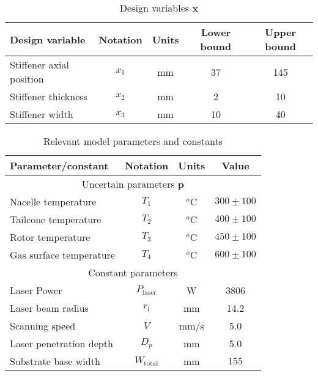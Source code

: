 \begin{table}[h!]
    \centering
    \renewcommand{\arraystretch}{1.0}%
    \small\addtolength{\tabcolsep}{-2pt}
    \caption{Design variables ${\textbf{x}}$}
    \label{table:STOmodelinputs}
    \begin{tabular}{lcccc}
    \hline\hline
    \bf Design variable & \bf Notation & \bf Units & \bf Lower bound & \bf Upper bound \\
    \hline
    Stiffener axial position & $x_1$ & mm & 37 & 145 \\
    Stiffener thickness  & $x_2$ & mm & 2 & 10 \\
    Stiffener width & $x_3$ & mm & 10 & 40  \\
    \hline\hline
    \end{tabular}
\end{table}

\begin{table}[h!]
	\centering
	\renewcommand{\arraystretch}{1.0}%
	\small\addtolength{\tabcolsep}{-2pt}
	\caption{Relevant model parameters and constants}
	\label{table:STOmodelparameters}
	\begin{tabular}{lccc}
	\hline\hline
	\bf Parameter/constant & \bf Notation & \bf Units & \bf Value \\
	\hline
    \multicolumn{4}{c}{Uncertain parameters $\mathbf{p}$} \\ 
	Nacelle temperature & $T_1$ & $^{o}$C & $300 \pm 100$ \\ 
	Tailcone temperature & $T_2$ & $^{o}$C & $400 \pm 100$ \\ 
	Rotor temperature & $T_3$ & $^{o}$C & $450 \pm 100$ \\ 
	Gas surface temperature & $T_4$ & $^{o}$C & $600 \pm 100$ \\ \hline
    \multicolumn{4}{c}{Constant parameters} \\
	Laser Power & ${P_\textrm{laser}}$ & W &  3806 \\ 
	Laser beam radius & ${r_l}$ & mm & 14.2 \\ 
	Scanning speed& ${V}$ & mm/s & 5.0 \\ 
	Laser penetration depth & $D_p$ & mm & 5.0 \\
	Substrate base width & $W_{\textrm{total}}$ & mm & $155$ \\
	\hline\hline
	\end{tabular}
\end{table}

